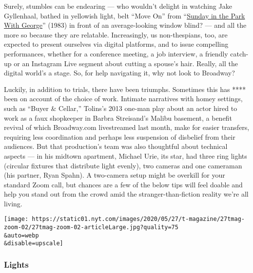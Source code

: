 Surely, stumbles can be endearing --- who wouldn't delight in watching
Jake Gyllenhaal, bathed in yellowish light, belt ``Move On'' from
``\href{https://www.thehudsonbroadway.com/whatson/sunday-in-the-park-with-george/}{Sunday
in the Park With George}'' (1983) in front of an average-looking window
blind? --- and all the more so because they are relatable. Increasingly,
us non-thespians, too, are expected to present ourselves via digital
platforms, and to issue compelling performances, whether for a
conference meeting, a job interview, a friendly catch-up or an Instagram
Live segment about cutting a spouse's hair. Really, all the digital
world's a stage. So, for help navigating it, why not look to Broadway?

Luckily, in addition to trials, there have been triumphs. Sometimes this
has **** been on account of the choice of work. Intimate narratives with
homey settings, such as ``Buyer \& Cellar,'' Tolins's 2013 one-man play
about an actor hired to work as a faux shopkeeper in Barbra Streisand's
Malibu basement, a benefit revival of which Broadway.com livestreamed
last month, make for easier transfers, requiring less coordination and
perhaps less suspension of disbelief from their audiences. But that
production's team was also thoughtful about technical aspects --- in his
midtown apartment, Michael Urie, its star, had three ring lights
(circular fixtures that distribute light evenly), two cameras and one
cameraman (his partner, Ryan Spahn). A two-camera setup might be
overkill for your standard Zoom call, but chances are a few of the below
tips will feel doable and help you stand out from the crowd amid the
stranger-than-fiction reality we're all living.

\texttt{[image: https://static01.nyt.com/images/2020/05/27/t-magazine/27tmag-zoom-02/27tmag-zoom-02-articleLarge.jpg?quality=75\\\&auto=webp\\\&disable=upscale]}

\hypertarget{lights}{%
\subsubsection{\texorpdfstring{\textbf{Lights}}{Lights}}\label{lights}}

